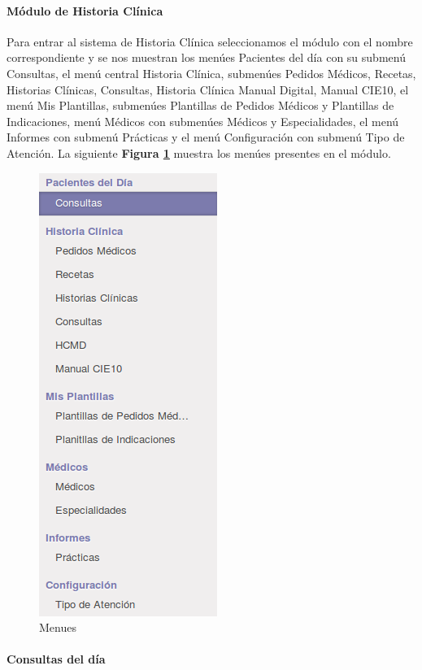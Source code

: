 \paragraph{Módulo de Historia Clínica}

Para entrar al sistema de Historia Clínica seleccionamos el módulo con el nombre correspondiente y se nos muestran los menúes Pacientes del día con su submenú Consultas, el menú central Historia Clínica, submenúes Pedidos Médicos, Recetas, Historias Clínicas, Consultas, Historia Clínica Manual Digital, Manual CIE10, el menú Mis Plantillas, submenúes Plantillas de Pedidos Médicos y Plantillas de Indicaciones, menú Médicos con submenúes Médicos y Especialidades, el menú Informes con submenú Prácticas y el menú Configuración con submenú Tipo de Atención. La siguiente \textbf{Figura \ref{submenu}} muestra los menúes presentes en el módulo.

\begin{figure}[h]
      \centering
      \includegraphics[height=.3\textheight]{img/tp1/HE/MenuHC}
      \caption{Menues}
      \label{submenu}
\end{figure}


\paragraph{Consultas del día}

